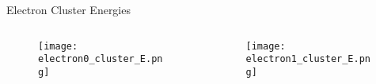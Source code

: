 \documentclass[aspectratio=169]{beamer}
\begin{document}
\begin{frame}{Electron Cluster Energies}
  \begin{columns}
    \begin{column}{0.5\textwidth}
      \begin{figure}
        \centering
        \texttt{[image: electron0\_cluster\_E.png]}
      \end{figure}
    \end{column}
    \begin{column}{0.5\textwidth}
      \begin{figure}
        \centering
        \texttt{[image: electron1\_cluster\_E.png]}
      \end{figure}
    \end{column}
  \end{columns}
\end{frame}
\end{document}
